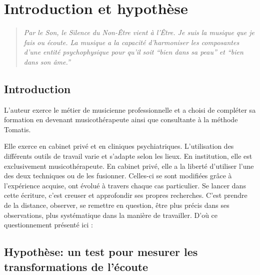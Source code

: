 \chapter{Introduction et hypothèse}
\begin{quotation}
\emph{Par le Son, le Silence du Non-Être vient à l'Être. Je suis
la musique que je fais ou écoute. La musique a la capacité d'harmoniser
les composantes d'une entité psychophysique pour qu'il soit ``bien
dans sa peau'' et ``bien dans son âme.''}\, \autocite[ch. 0, p. 000]{viret:b}
\end{quotation}

\section{Introduction}

L'auteur exerce le métier de musicienne professionnelle et a  choisi de compléter sa formation en devenant musicothérapeute  ainsi que consultante à la méthode Tomatis.  



Elle exerce en cabinet privé et en cliniques psychiatriques. L'utilisation des différents outils de travail varie et s'adapte selon les lieux. En institution, elle est exclusivement musicothérapeute. En cabinet
privé, elle a la liberté d'utiliser l'une des deux techniques ou de les fusionner. Celles-ci se sont modifiées grâce à  l'expérience acquise, ont évolué  
à travers chaque cas particulier.
 Se lancer dans cette écriture, c'est creuser et approfondir ses propres recherches. C'est prendre de la distance, observer, se remettre en question, être plus précis dans ses observations, plus systématique dans la manière de travailler. D'où ce questionnement présenté ici : 


\section{Hypothèse: un test pour mesurer les transformations de l'écoute}

